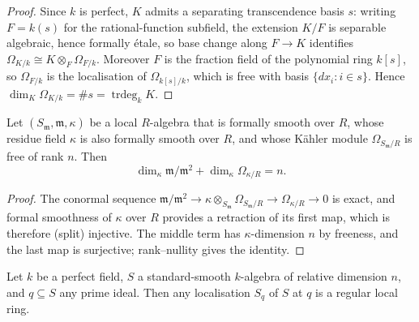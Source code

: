 \begin{proof}
  \leanok
  Since \(k\) is perfect, \(K\) admits a separating transcendence basis \(s\):
  writing \(F = k(s)\) for the rational-function subfield, the extension
  \(K/F\) is separable algebraic, hence formally \'etale, so base change along
  \(F \to K\) identifies \(\Omega_{K/k} \cong K \otimes_F \Omega_{F/k}\).
  Moreover \(F\) is the fraction field of the polynomial ring \(k[s]\), so
  \(\Omega_{F/k}\) is the localisation of \(\Omega_{k[s]/k}\), which is free
  with basis \(\{dx_i : i \in s\}\). Hence
  \(\dim_K \Omega_{K/k} = \#s = \operatorname{trdeg}_k K\).
\end{proof}

\begin{lemma}
  \label{lem:conormal_finrank_identity}
  Let \((S_{\mathfrak m}, \mathfrak m, \kappa)\) be a local \(R\)-algebra that
  is formally smooth over \(R\), whose residue field \(\kappa\) is also
  formally smooth over \(R\), and whose K\"ahler module
  \(\Omega_{S_{\mathfrak m}/R}\) is free of rank \(n\). Then
  \[\dim_\kappa \mathfrak m/\mathfrak m^2 + \dim_\kappa \Omega_{\kappa/R} = n.\]
\end{lemma}

\begin{proof}
  \leanok
  The conormal sequence
  \(\mathfrak m/\mathfrak m^2 \to \kappa \otimes_{S_{\mathfrak m}}
  \Omega_{S_{\mathfrak m}/R} \to \Omega_{\kappa/R} \to 0\)
  is exact, and formal smoothness of \(\kappa\) over \(R\) provides a
  retraction of its first map, which is therefore (split) injective. The
  middle term has \(\kappa\)-dimension \(n\) by freeness, and the last map is
  surjective; rank--nullity gives the identity.
\end{proof}

\begin{theorem}
  \label{thm:standard_smooth_regular_at_prime}
  Let \(k\) be a perfect field, \(S\) a standard-smooth \(k\)-algebra of
  relative dimension \(n\), and \(q \subseteq S\) any prime ideal. Then any
  localisation \(S_q\) of \(S\) at \(q\) is a regular local ring.
\end{theorem}

